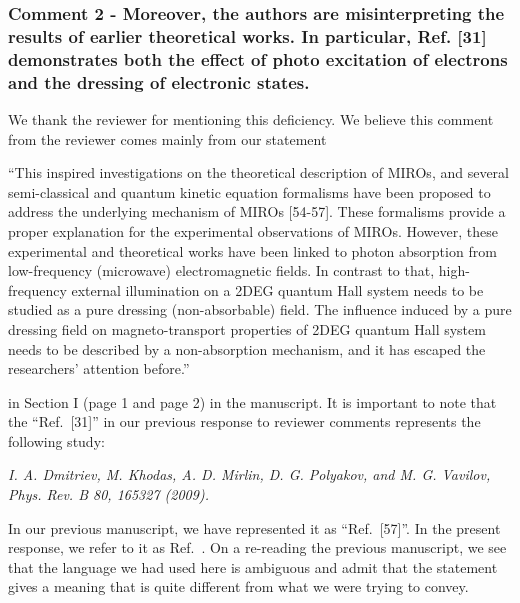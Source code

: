 \documentclass{article}
\begin{document}
\subsubsection*{Comment 2 -
\color{RoyalBlue} Moreover, the authors are misinterpreting the results of earlier theoretical works. In particular, Ref. [31] demonstrates both the effect of photo excitation of electrons and the dressing of electronic states.}

We thank the reviewer for mentioning this deficiency. We believe this comment from the reviewer comes mainly from our statement

“This inspired investigations on the theoretical description of MIROs, and several semi-classical and quantum kinetic equation formalisms have been proposed to address the underlying mechanism of MIROs [54-57]. These formalisms provide a proper explanation for the experimental observations of MIROs. However, these experimental and theoretical works have been linked to photon absorption from low-frequency (microwave) electromagnetic fields.
In contrast to that, high-frequency external illumination on a 2DEG quantum Hall system needs to be studied as a pure dressing (non-absorbable) field.
The influence induced by a pure dressing field on
magneto-transport properties of 2DEG quantum Hall system needs to be described by a non-absorption mechanism, and it has escaped the researchers’ attention before.”

in Section I (page 1 and page 2) in the manuscript. It is important to note that the ``Ref.~[31]'' in our previous response to reviewer comments represents the following study:

\textit{I. A. Dmitriev, M. Khodas, A. D. Mirlin, D. G. Polyakov, and M. G. Vavilov, Phys. Rev. B 80, 165327 (2009).}

In our previous manuscript, we have represented it as ``Ref.~[57]''. In the present response, we refer to it as Ref.~\cite{dmitriev09}.
On a re-reading the previous manuscript, we see that the language we had used here is ambiguous and admit that the statement gives a meaning that is quite different from what we were trying to convey.
\end{document}
